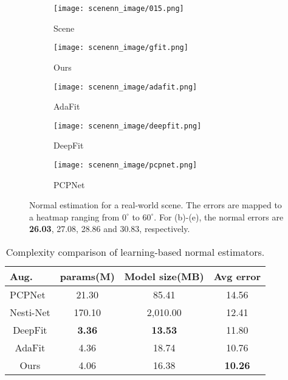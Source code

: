 \documentclass[runningheads]{llncs}
\begin{document}
\begin{figure}[]
  \centering

  \begin{subfigure}{0.19\linewidth}
    \texttt{[image: scenenn\_image/015.png]}
    \caption{Scene}
  \end{subfigure}
       \begin{subfigure}{0.19\linewidth}
    \texttt{[image: scenenn\_image/gfit.png]}
    \caption{Ours}
  \end{subfigure}
  \begin{subfigure}{0.19\linewidth}
    \texttt{[image: scenenn\_image/adafit.png]}
    \caption{AdaFit}
  \end{subfigure}
  \begin{subfigure}{0.19\linewidth}
    \texttt{[image: scenenn\_image/deepfit.png]}
    \caption{DeepFit}
  \end{subfigure}
  \begin{subfigure}{0.19\linewidth}
    \texttt{[image: scenenn\_image/pcpnet.png]}
    \caption{PCPNet}
  \end{subfigure}
  \caption{Normal estimation for a real-world scene.
  The errors are mapped to a heatmap ranging from $0^\circ$ to $60^\circ$. For (b)-(e), the normal errors are \textbf{26.03}, 27.08, 28.86 and 30.83, respectively.
}
  \label{fig:quali2}
\end{figure}
\begin{table}[t]
\begin{center}
\caption{Complexity comparison of learning-based normal estimators.}
\begin{tabular}{@{}cccc@{}}
\toprule
\multicolumn{1}{l}{\textbf{Aug.}}   & params(M) & Model size(MB) & Avg error             \\ \midrule
\multicolumn{1}{l}{PCPNet} & 21.30           & 85.41    & 14.56                     \\
Nesti-Net              & 170.10          & 2,010.00     & 12.41                     \\
DeepFit                  & \textbf{3.36}          & \textbf{13.53}    & 11.80                      \\
AdaFit                  & 4.36           & 18.74    & 10.76                     \\
Ours                       & 4.06           & 16.38    & \textbf{10.26} \\ \bottomrule
\end{tabular}

\label{tab:eff}
\end{center}
\end{table}
\end{document}
